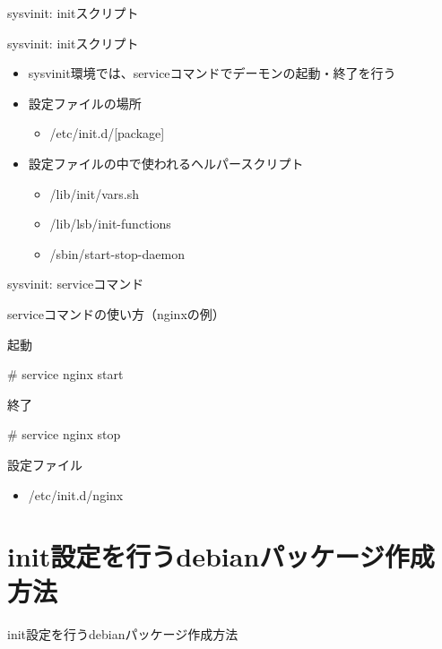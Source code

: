 \begin{frame}
  \begin{center}\Huge{sysvinit: initスクリプト}\end{center}
\end{frame} 

\begin{frame}[containsverbatim]{sysvinit: initスクリプト}
  \begin{itemize}
  \item sysvinit環境では、serviceコマンドでデーモンの起動・終了を行う
  \item 設定ファイルの場所
    \begin{itemize}
    \item /etc/init.d/[package]
    \end{itemize}
  \item 設定ファイルの中で使われるヘルパースクリプト
    \begin{itemize}
    \item /lib/init/vars.sh
    \item /lib/lsb/init-functions
    \item /sbin/start-stop-daemon
    \end{itemize}
  \end{itemize}
\end{frame}


\begin{frame}[containsverbatim]{sysvinit: serviceコマンド}

serviceコマンドの使い方（nginxの例）

起動
\begin{commandline}
# service nginx start
\end{commandline}

終了
\begin{commandline}
# service nginx stop
\end{commandline}

設定ファイル
\begin{itemize}
\item /etc/init.d/nginx
\end{itemize}
    
\end{frame}


\section{init設定を行うdebianパッケージ作成方法}

\begin{frame}
  \begin{center}\Huge{init設定を行うdebianパッケージ作成方法}\end{center}
\end{frame} 

